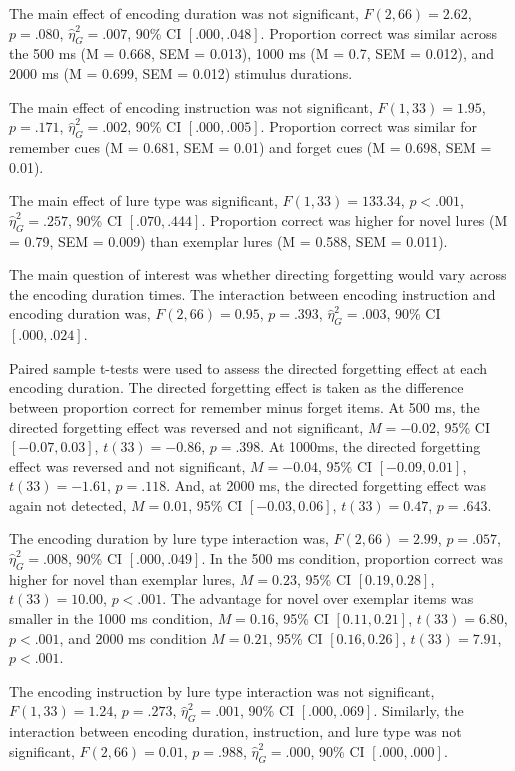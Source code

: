 \documentclass[
  man,floatsintext]{apa6}
\begin{document}
The main effect of encoding duration was not significant, \(F(2, 66) = 2.62\), \(p = .080\), \(\hat{\eta}^2_G = .007\), 90\% CI \([.000, .048]\). Proportion correct was similar across the 500 ms (M = 0.668, SEM = 0.013), 1000 ms (M = 0.7, SEM = 0.012), and 2000 ms (M = 0.699, SEM = 0.012) stimulus durations.

The main effect of encoding instruction was not significant, \(F(1, 33) = 1.95\), \(p = .171\), \(\hat{\eta}^2_G = .002\), 90\% CI \([.000, .005]\). Proportion correct was similar for remember cues (M = 0.681, SEM = 0.01) and forget cues (M = 0.698, SEM = 0.01).

The main effect of lure type was significant, \(F(1, 33) = 133.34\), \(p < .001\), \(\hat{\eta}^2_G = .257\), 90\% CI \([.070, .444]\). Proportion correct was higher for novel lures (M = 0.79, SEM = 0.009) than exemplar lures (M = 0.588, SEM = 0.011).

The main question of interest was whether directing forgetting would vary across the encoding duration times. The interaction between encoding instruction and encoding duration was, \(F(2, 66) = 0.95\), \(p = .393\), \(\hat{\eta}^2_G = .003\), 90\% CI \([.000, .024]\).

Paired sample t-tests were used to assess the directed forgetting effect at each encoding duration. The directed forgetting effect is taken as the difference between proportion correct for remember minus forget items. At 500 ms, the directed forgetting effect was reversed and not significant, \(M = -0.02\), 95\% CI \([-0.07, 0.03]\), \(t(33) = -0.86\), \(p = .398\). At 1000ms, the directed forgetting effect was reversed and not significant, \(M = -0.04\), 95\% CI \([-0.09, 0.01]\), \(t(33) = -1.61\), \(p = .118\). And, at 2000 ms, the directed forgetting effect was again not detected, \(M = 0.01\), 95\% CI \([-0.03, 0.06]\), \(t(33) = 0.47\), \(p = .643\).

The encoding duration by lure type interaction was, \(F(2, 66) = 2.99\), \(p = .057\), \(\hat{\eta}^2_G = .008\), 90\% CI \([.000, .049]\). In the 500 ms condition, proportion correct was higher for novel than exemplar lures, \(M = 0.23\), 95\% CI \([0.19, 0.28]\), \(t(33) = 10.00\), \(p < .001\). The advantage for novel over exemplar items was smaller in the 1000 ms condition, \(M = 0.16\), 95\% CI \([0.11, 0.21]\), \(t(33) = 6.80\), \(p < .001\), and 2000 ms condition \(M = 0.21\), 95\% CI \([0.16, 0.26]\), \(t(33) = 7.91\), \(p < .001\).

The encoding instruction by lure type interaction was not significant, \(F(1, 33) = 1.24\), \(p = .273\), \(\hat{\eta}^2_G = .001\), 90\% CI \([.000, .069]\). Similarly, the interaction between encoding duration, instruction, and lure type was not significant, \(F(2, 66) = 0.01\), \(p = .988\), \(\hat{\eta}^2_G = .000\), 90\% CI \([.000, .000]\).
\end{document}
